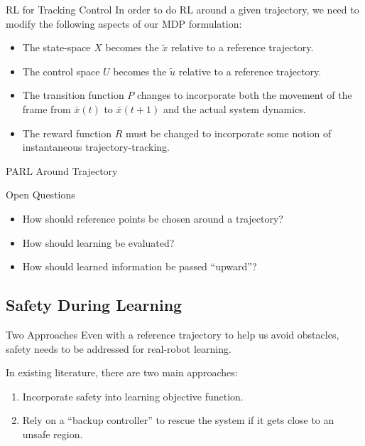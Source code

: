 \documentclass{beamer}
\begin{document}
\begin{frame}{RL for Tracking Control}
  In order to do RL around a given trajectory, we need to modify the following
  aspects of our MDP formulation:
  \begin{itemize}
    \item The state-space $X$ becomes the $\tilde{x}$ relative to a reference trajectory.
    \item The control space $U$ becomes the $\tilde{u}$ relative to a reference trajectory.
    \item The transition function $P$ changes to incorporate both the movement
      of the frame from $\bar{x}(t)$ to $\bar{x}(t+1)$ and the actual system
      dynamics.
    \item The reward function $R$ must be changed to incorporate some notion of
      instantaneous trajectory-tracking.
  \end{itemize}

\end{frame}

\begin{frame}{PARL Around Trajectory}
  \begin{figure}
  \end{figure}
\end{frame}

\begin{frame}{Open Questions}
  \begin{itemize}
      \item How should reference points be chosen around a trajectory?
      \item How should learning be evaluated?
      \item How should learned information be passed ``upward''?
  \end{itemize}
\end{frame}

\subsection{Safety During Learning}

\begin{frame}{Two Approaches}
  Even with a reference trajectory to help us avoid obstacles, safety needs to
  be addressed for real-robot learning.
  
  In existing literature, there are two main approaches:
  \begin{enumerate}
      \item Incorporate safety into learning objective function.
      \item Rely on a ``backup controller'' to rescue the system if it gets
        close to an unsafe region.
  \end{enumerate}
\end{frame}
\end{document}

